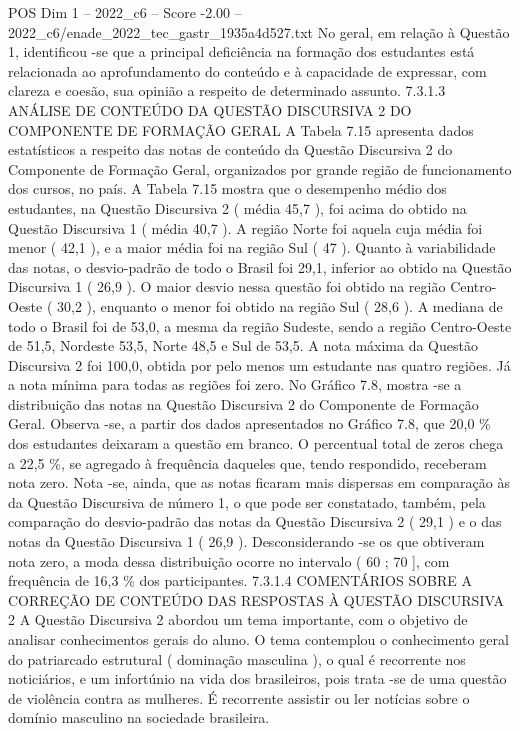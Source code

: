 \begin{textsample}{POS Dim 1 – 2022\_c6 – Score -2.00 – 2022\_c6/enade\_2022\_tec\_gastr\_1935a4d527.txt}
No geral, em relação à Questão 1, identificou -se que a principal deficiência na formação dos estudantes está relacionada ao aprofundamento do conteúdo e à capacidade de expressar, com clareza e coesão, sua opinião a respeito de determinado assunto. 7.3.1.3 ANÁLISE DE CONTEÚDO DA QUESTÃO DISCURSIVA 2 DO COMPONENTE DE FORMAÇÃO GERAL A Tabela 7.15 apresenta dados estatísticos a respeito das notas de conteúdo da Questão Discursiva 2 do Componente de Formação Geral, organizados por grande região de funcionamento dos cursos, no país.
A Tabela 7.15 mostra que o desempenho médio dos estudantes, na Questão Discursiva 2 ( média 45,7 ), foi acima do obtido na Questão Discursiva 1 ( média 40,7 ).
A região Norte foi aquela cuja média foi menor ( 42,1 ), e a maior média foi na região Sul ( 47 ).
Quanto à variabilidade das notas, o desvio-padrão de todo o Brasil foi 29,1, inferior ao obtido na Questão Discursiva 1 ( 26,9 ).
O maior desvio nessa questão foi obtido na região Centro-Oeste ( 30,2 ), enquanto o menor foi obtido na região Sul ( 28,6 ).
A mediana de todo o Brasil foi de 53,0, a mesma da região Sudeste, sendo a região Centro-Oeste de 51,5, Nordeste 53,5, Norte 48,5 e Sul de 53,5.
A nota máxima da Questão Discursiva 2 foi 100,0, obtida por pelo menos um estudante nas quatro regiões.
Já a nota mínima para todas as regiões foi zero.
No Gráfico 7.8, mostra -se a distribuição das notas na Questão Discursiva 2 do Componente de Formação Geral.
Observa -se, a partir dos dados apresentados no Gráfico 7.8, que 20,0 \% dos estudantes deixaram a questão em branco.
O percentual total de zeros chega a 22,5 \%, se agregado à frequência daqueles que, tendo respondido, receberam nota zero.
Nota -se, ainda, que as notas ficaram mais dispersas em comparação às da Questão Discursiva de número 1, o que pode ser constatado, também, pela comparação do desvio-padrão das notas da Questão Discursiva 2 ( 29,1 ) e o das notas da Questão Discursiva 1 ( 26,9 ).
Desconsiderando -se os que obtiveram nota zero, a moda dessa distribuição ocorre no intervalo ( 60 ; 70 ], com frequência de 16,3 \% dos participantes. 7.3.1.4 COMENTÁRIOS SOBRE A CORREÇÃO DE CONTEÚDO DAS RESPOSTAS À QUESTÃO DISCURSIVA 2 A Questão Discursiva 2 abordou um tema importante, com o objetivo de analisar conhecimentos gerais do aluno.
O tema contemplou o conhecimento geral do patriarcado estrutural ( dominação masculina ), o qual é recorrente nos noticiários, e um infortúnio na vida dos brasileiros, pois trata -se de uma questão de violência contra as mulheres.
É recorrente assistir ou ler notícias sobre o domínio masculino na sociedade brasileira.

\end{textsample}
